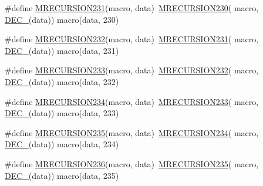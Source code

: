 \begin{DoxyCompactItemize}
\item 
\#define \mbox{\hyperlink{group__group__sam0__utils__mrecursion_ga924bf3ce6728e48c4ef04ba0bc5f0707}{M\+R\+E\+C\+U\+R\+S\+I\+O\+N231}}(macro,  data)~\mbox{\hyperlink{group__group__sam0__utils__mrecursion_ga4eeac3211fea63e6fe6eb6b32b6fbc89}{M\+R\+E\+C\+U\+R\+S\+I\+O\+N230}}(  macro, \mbox{\hyperlink{group__group__sam0__utils__mrecursion_ga1d23d683797679dca8c3512a54a5dcae}{D\+E\+C\+\_\+}}(data))   macro(data, 230)
\item 
\#define \mbox{\hyperlink{group__group__sam0__utils__mrecursion_ga6eaa22abc9c118aceaec7716bcaf7158}{M\+R\+E\+C\+U\+R\+S\+I\+O\+N232}}(macro,  data)~\mbox{\hyperlink{group__group__sam0__utils__mrecursion_ga924bf3ce6728e48c4ef04ba0bc5f0707}{M\+R\+E\+C\+U\+R\+S\+I\+O\+N231}}(  macro, \mbox{\hyperlink{group__group__sam0__utils__mrecursion_ga1d23d683797679dca8c3512a54a5dcae}{D\+E\+C\+\_\+}}(data))   macro(data, 231)
\item 
\#define \mbox{\hyperlink{group__group__sam0__utils__mrecursion_ga81fce57cdf82d227ab4610a36a8614e4}{M\+R\+E\+C\+U\+R\+S\+I\+O\+N233}}(macro,  data)~\mbox{\hyperlink{group__group__sam0__utils__mrecursion_ga6eaa22abc9c118aceaec7716bcaf7158}{M\+R\+E\+C\+U\+R\+S\+I\+O\+N232}}(  macro, \mbox{\hyperlink{group__group__sam0__utils__mrecursion_ga1d23d683797679dca8c3512a54a5dcae}{D\+E\+C\+\_\+}}(data))   macro(data, 232)
\item 
\#define \mbox{\hyperlink{group__group__sam0__utils__mrecursion_ga6e4d96e8ad67be74b062f79374f9e08f}{M\+R\+E\+C\+U\+R\+S\+I\+O\+N234}}(macro,  data)~\mbox{\hyperlink{group__group__sam0__utils__mrecursion_ga81fce57cdf82d227ab4610a36a8614e4}{M\+R\+E\+C\+U\+R\+S\+I\+O\+N233}}(  macro, \mbox{\hyperlink{group__group__sam0__utils__mrecursion_ga1d23d683797679dca8c3512a54a5dcae}{D\+E\+C\+\_\+}}(data))   macro(data, 233)
\item 
\#define \mbox{\hyperlink{group__group__sam0__utils__mrecursion_gaa7d5430690e1370d6f49a1e6378b6afb}{M\+R\+E\+C\+U\+R\+S\+I\+O\+N235}}(macro,  data)~\mbox{\hyperlink{group__group__sam0__utils__mrecursion_ga6e4d96e8ad67be74b062f79374f9e08f}{M\+R\+E\+C\+U\+R\+S\+I\+O\+N234}}(  macro, \mbox{\hyperlink{group__group__sam0__utils__mrecursion_ga1d23d683797679dca8c3512a54a5dcae}{D\+E\+C\+\_\+}}(data))   macro(data, 234)
\item 
\#define \mbox{\hyperlink{group__group__sam0__utils__mrecursion_gac42f885ee78a99d9b0ea05eee47744f7}{M\+R\+E\+C\+U\+R\+S\+I\+O\+N236}}(macro,  data)~\mbox{\hyperlink{group__group__sam0__utils__mrecursion_gaa7d5430690e1370d6f49a1e6378b6afb}{M\+R\+E\+C\+U\+R\+S\+I\+O\+N235}}(  macro, \mbox{\hyperlink{group__group__sam0__utils__mrecursion_ga1d23d683797679dca8c3512a54a5dcae}{D\+E\+C\+\_\+}}(data))   macro(data, 235)

\end{DoxyCompactItemize}
